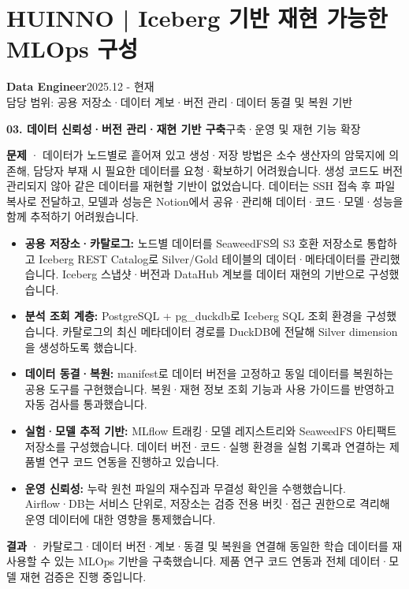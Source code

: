 \documentclass[a4paper,11pt]{article}
\newcommand{\role}[3]{\textbf{#1}\hfill{\small #2}\\{\small\color{muted}#3}\par}
\newcommand{\project}[2]{\vspace{5pt}\textbf{\color{accent}#1}\hfill{\small\color{muted}#2}\par}
\begin{document}
\section{HUINNO | Iceberg 기반 재현 가능한 MLOps 구성}
\role{Data Engineer}{2025.12 - 현재}{담당 범위: 공용 저장소·데이터 계보·버전 관리·데이터 동결 및 복원 기반}
\project{03. 데이터 신뢰성·버전 관리·재현 기반 구축}{구축·운영 및 재현 기능 확장}
\textbf{문제} · 데이터가 노드별로 흩어져 있고 생성·저장 방법은 소수 생산자의 암묵지에 의존해, 담당자 부재 시 필요한 데이터를 요청·확보하기 어려웠습니다. 생성 코드도 버전 관리되지 않아 같은 데이터를 재현할 기반이 없었습니다. 데이터는 SSH 접속 후 파일 복사로 전달하고, 모델과 성능은 Notion에서 공유·관리해 데이터·코드·모델·성능을 함께 추적하기 어려웠습니다.
\begin{itemize}
\item \textbf{공용 저장소·카탈로그:} 노드별 데이터를 SeaweedFS의 S3 호환 저장소로 통합하고 Iceberg REST Catalog로 Silver/Gold 테이블의 데이터·메타데이터를 관리했습니다. Iceberg 스냅샷·버전과 DataHub 계보를 데이터 재현의 기반으로 구성했습니다.
\item \textbf{분석 조회 계층:} PostgreSQL + pg\_duckdb로 Iceberg SQL 조회 환경을 구성했습니다. 카탈로그의 최신 메타데이터 경로를 DuckDB에 전달해 Silver dimension을 생성하도록 했습니다.
\item \textbf{데이터 동결·복원:} manifest로 데이터 버전을 고정하고 동일 데이터를 복원하는 공용 도구를 구현했습니다. 복원·재현 정보 조회 기능과 사용 가이드를 반영하고 자동 검사를 통과했습니다.
\item \textbf{실험·모델 추적 기반:} MLflow 트래킹·모델 레지스트리와 SeaweedFS 아티팩트 저장소를 구성했습니다. 데이터 버전·코드·실행 환경을 실험 기록과 연결하는 제품별 연구 코드 연동을 진행하고 있습니다.
\item \textbf{운영 신뢰성:} 누락 원천 파일의 재수집과 무결성 확인을 수행했습니다. Airflow·DB는 서비스 단위로, 저장소는 검증 전용 버킷·접근 권한으로 격리해 운영 데이터에 대한 영향을 통제했습니다.
\end{itemize}
\textbf{결과} · 카탈로그·데이터 버전·계보·동결 및 복원을 연결해 동일한 학습 데이터를 재사용할 수 있는 MLOps 기반을 구축했습니다. 제품 연구 코드 연동과 전체 데이터·모델 재현 검증은 진행 중입니다.
\end{document}
